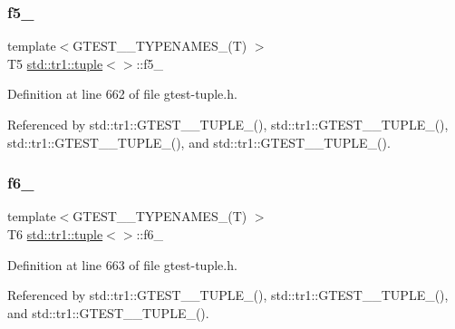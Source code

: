 \mbox{\label{classstd_1_1tr1_1_1tuple_a32d8cd6f180c0a77d83733fc65423657}} 
\subsubsection{\texorpdfstring{f5\+\_\+}{f5\_}}
{\footnotesize\ttfamily template$<$G\+T\+E\+S\+T\+\_\+\_\+\+T\+Y\+P\+E\+N\+A\+M\+E\+S\+\_\+(\+T) $>$ \\
T5 \hyperlink{classstd_1_1tr1_1_1tuple}{std\+::tr1\+::tuple}$<$$>$\+::f5\+\_\+}



Definition at line 662 of file gtest-\/tuple.\+h.



Referenced by std\+::tr1\+::\+G\+T\+E\+S\+T\+\_\+\_\+\+T\+U\+P\+L\+E\+\_\+(), std\+::tr1\+::\+G\+T\+E\+S\+T\+\_\+\_\+\+T\+U\+P\+L\+E\+\_\+(), std\+::tr1\+::\+G\+T\+E\+S\+T\+\_\+\_\+\+T\+U\+P\+L\+E\+\_\+(), and std\+::tr1\+::\+G\+T\+E\+S\+T\+\_\+\_\+\+T\+U\+P\+L\+E\+\_\+().

\mbox{\label{classstd_1_1tr1_1_1tuple_a597beab3af3f95c84408491ab14632b0}} 
\subsubsection{\texorpdfstring{f6\+\_\+}{f6\_}}
{\footnotesize\ttfamily template$<$G\+T\+E\+S\+T\+\_\+\_\+\+T\+Y\+P\+E\+N\+A\+M\+E\+S\+\_\+(\+T) $>$ \\
T6 \hyperlink{classstd_1_1tr1_1_1tuple}{std\+::tr1\+::tuple}$<$$>$\+::f6\+\_\+}



Definition at line 663 of file gtest-\/tuple.\+h.



Referenced by std\+::tr1\+::\+G\+T\+E\+S\+T\+\_\+\_\+\+T\+U\+P\+L\+E\+\_\+(), std\+::tr1\+::\+G\+T\+E\+S\+T\+\_\+\_\+\+T\+U\+P\+L\+E\+\_\+(), and std\+::tr1\+::\+G\+T\+E\+S\+T\+\_\+\_\+\+T\+U\+P\+L\+E\+\_\+().

\mbox{\label{classstd_1_1tr1_1_1tuple_a7c28780e616d382833e844f62672c6bc}} 
